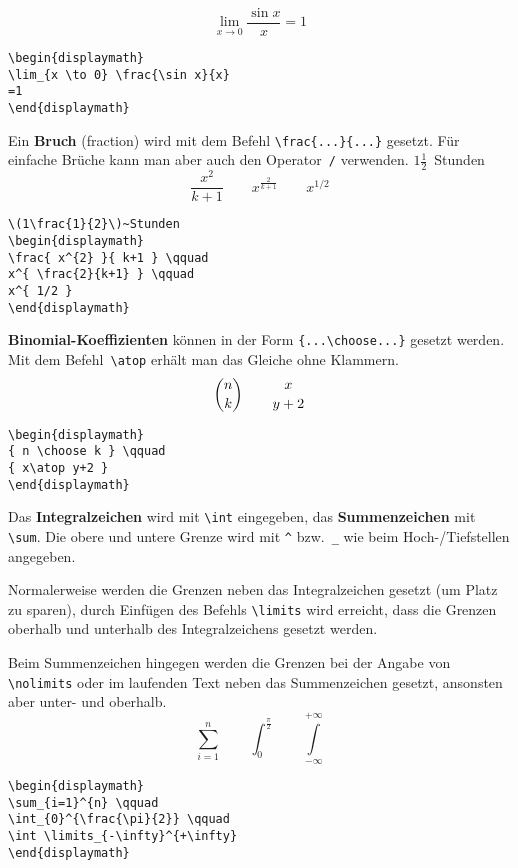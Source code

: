 \exa
\begin{displaymath}
\lim_{x \to 0} \frac{\sin x}{x}
=1
\end{displaymath}
\exb
\begin{verbatim}
\begin{displaymath}
\lim_{x \to 0} \frac{\sin x}{x}
=1
\end{displaymath}
\end{verbatim}
\exc
 
Ein \textbf{Bruch} (fraction) wird mit dem Befehl
\verb|\frac{...}{...}| gesetzt.  Für einfache Brüche kann man
aber auch den Operator~\verb|/| verwenden.
\exa
\(1\frac{1}{2}\)~Stunden
\begin{displaymath}
\frac{ x^{2} }{ k+1 } \qquad
x^{ \frac{2}{k+1} } \qquad
x^{ 1/2 }
\end{displaymath}
\exb
\begin{verbatim}
\(1\frac{1}{2}\)~Stunden
\begin{displaymath}
\frac{ x^{2} }{ k+1 } \qquad
x^{ \frac{2}{k+1} } \qquad
x^{ 1/2 }
\end{displaymath}
\end{verbatim}
\exc

\textbf{Binomial-Koeffizienten} können in der Form
\verb|{...\choose...}| gesetzt werden.
Mit dem Befehl~\verb|\atop| erhält man das Gleiche ohne
Klammern.
\exa
\begin{displaymath}
{ n \choose k } \qquad
{ x\atop y+2 }
\end{displaymath}
\exb
\begin{verbatim}
\begin{displaymath}
{ n \choose k } \qquad
{ x\atop y+2 }
\end{displaymath}
\end{verbatim}
\exc

\medskip

Das \textbf{Integralzeichen} wird mit \verb|\int| eingegeben, das
\textbf{Summenzeichen} mit \verb|\sum|.
Die obere und untere Grenze wird mit \verb|^| bzw.~\verb|_| wie
beim \mbox{Hoch-}\slash Tiefstellen angegeben.
 
Normalerweise werden die Grenzen neben das Integralzeichen
gesetzt (um Platz zu sparen), durch Einfügen des Befehls
\verb|\limits| wird erreicht, dass die Grenzen oberhalb und
unterhalb des Integralzeichens gesetzt werden.
 
Beim Summenzeichen hingegen werden die Grenzen bei der Angabe von
\verb|\nolimits| oder im laufenden Text neben das Summenzeichen
gesetzt, ansonsten aber unter- und oberhalb.
\exa
\begin{displaymath}
\sum_{i=1}^{n} \qquad
\int_{0}^{\frac{\pi}{2}} \qquad
\int \limits_{-\infty}^{+\infty}
\end{displaymath}
\exb
\begin{verbatim}
\begin{displaymath}
\sum_{i=1}^{n} \qquad
\int_{0}^{\frac{\pi}{2}} \qquad
\int \limits_{-\infty}^{+\infty}
\end{displaymath}
\end{verbatim}
\exc
 
